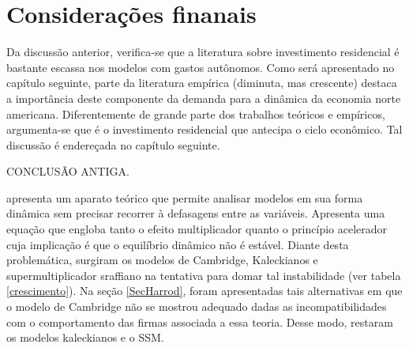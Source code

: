 \section{Considerações finanais}
\label{Concl1}


Da discussão anterior, verifica-se que a literatura sobre investimento residencial é bastante escassa nos modelos com gastos autônomos. Como será apresentado no capítulo seguinte, parte da literatura empírica (diminuta, mas crescente) destaca a importância deste componente da demanda para a dinâmica da economia norte americana. Diferentemente de grande parte dos trabalhos teóricos e empíricos, argumenta-se que é o investimento residencial que antecipa o ciclo econômico. Tal discussão é endereçada no capítulo seguinte.

CONCLUSÃO ANTIGA.


\textcite{harrod_essay_1939} apresenta um aparato teórico que permite analisar modelos em sua forma dinâmica sem precisar recorrer à defasagens entre as variáveis. Apresenta uma equação que engloba tanto o efeito multiplicador quanto o princípio acelerador cuja implicação é que o equilíbrio dinâmico não é estável. Diante desta problemática, surgiram os modelos de Cambridge, Kaleckianos e supermultiplicador sraffiano na tentativa para domar tal instabilidade (ver tabela \ref{crescimento}). Na seção \ref{SecHarrod}, foram apresentadas tais alternativas em que o modelo de Cambridge não se mostrou adequado dadas as incompatibilidades com o comportamento das firmas associada a essa teoria. Desse modo, restaram os modelos kaleckianos e o SSM. 

